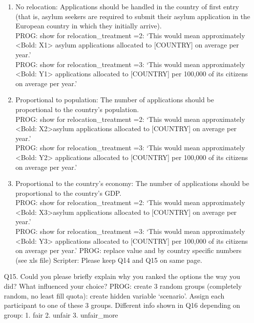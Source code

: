 \documentclass[
  12pt,
  a4paper,
]{article}
\providecommand{\tightlist}{%
  \setlength{\itemsep}{0pt}\setlength{\parskip}{0pt}}
\begin{document}
\begin{enumerate}
\def\labelenumi{\arabic{enumi}.}
\tightlist
\item
  No relocation: Applications should be handled in the country of first entry (that is, asylum seekers are required to submit their asylum application in the European country in which they initially arrive).\\
  PROG: show for relocation\_treatment =2: `This would mean approximately \textless Bold: X1\textgreater{} asylum applications allocated to {[}COUNTRY{]} on average per year.'\\
  PROG: show for relocation\_treatment =3: `This would mean approximately \textless Bold: Y1\textgreater{} applications allocated to {[}COUNTRY{]} per 100,000 of its citizens on average per year.'
\item
  Proportional to population: The number of applications should be proportional to the country's population.\\
  PROG: show for relocation\_treatment =2: `This would mean approximately \textless Bold: X2\textgreater asylum applications allocated to {[}COUNTRY{]} on average per year.'\\
  PROG: show for relocation\_treatment =3: `This would mean approximately \textless Bold: Y2\textgreater{} applications allocated to {[}COUNTRY{]} per 100,000 of its citizens on average per year.'
\item
  Proportional to the country's economy: The number of applications should be proportional to the country's GDP.\\
  PROG: show for relocation\_treatment =2: `This would mean approximately \textless Bold: X3\textgreater asylum applications allocated to {[}COUNTRY{]} on average per year.'\\
  PROG: show for relocation\_treatment =3: `This would mean approximately \textless Bold: Y3\textgreater{} applications allocated to {[}COUNTRY{]} per 100,000 of its citizens on average per year.'
  PROG: replace value and by country specific numbers (see xls file)
  Scripter: Please keep Q14 and Q15 on same page.
\end{enumerate}

Q15. Could you please briefly explain why you ranked the options the way you did? What influenced your choice?
PROG: create 3 random groups (completely random, no least fill quota): create hidden variable `scenario'. Assign each participant to one of these 3 groups. Different info shown in Q16 depending on group:
1. fair
2. unfair
3. unfair\_more
\end{document}
